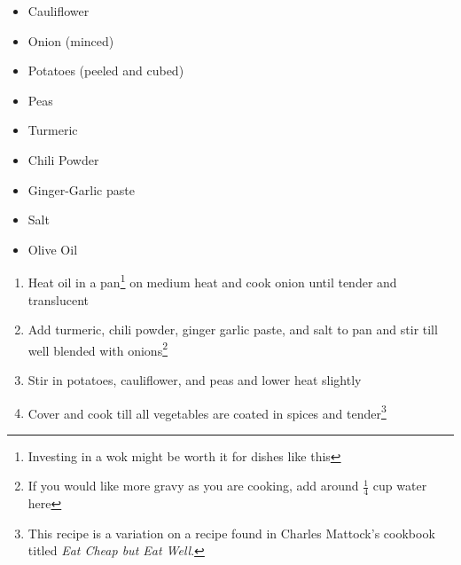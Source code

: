 \documentclass[oneside]{recipe}
\newcommand{\recipecolumn}[2]{
	\begin{multicols}{2}
	\raggedcolumns
	#1
	\columnbreak
	#2
	\end{multicols}
}
\begin{document}
\recipecolumn{
	\begin{itemize}
		\item Cauliflower
		\item Onion (minced)
		\item Potatoes (peeled and cubed)
		\item Peas
		\item Turmeric
		\item Chili Powder
		\item Ginger-Garlic paste
		\item Salt
		\item Olive Oil
	\end{itemize}
}{
	\begin{enumerate}
		\item Heat oil in a pan\footnote{Investing in a wok might be worth it for dishes like this} on medium heat and cook onion until tender and translucent
		\item Add turmeric, chili powder, ginger garlic paste, and salt to pan and stir till well blended with onions\footnote{If you would like more gravy as you are cooking, add around $\frac{1}{4}$ cup water here}
		\item Stir in potatoes, cauliflower, and peas and lower heat slightly
		\item Cover and cook till all vegetables are coated in spices and tender\footnote{This recipe is a variation on a recipe found in Charles Mattock's cookbook titled \textit{Eat Cheap but Eat Well}.}
	\end{enumerate}
}
\end{document}
